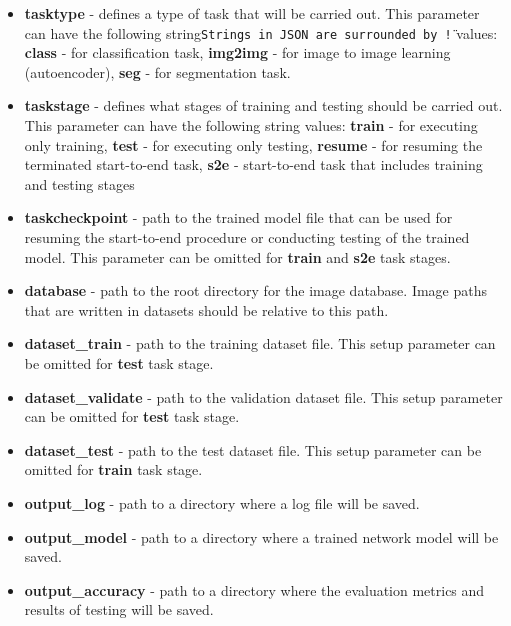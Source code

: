 \documentclass[a4paper, 11pt]{article}
\begin{document}
\begin{itemize}
    \item \textbf{tasktype} - defines a type of task that will be carried out. This parameter can have the following string\texttt{Strings in JSON are surrounded by \"!} values: \textbf{class} - for classification task, 
    \textbf{img2img} - for image to image learning (autoencoder), \textbf{seg} - for segmentation task.
    
    \item \textbf{taskstage} - defines what stages of training and testing should be carried out. This parameter can have the following string values: \textbf{train} - for executing only training, \textbf{test} - for executing only testing, \textbf{resume} - for resuming the terminated start-to-end task, \textbf{s2e} - start-to-end task that includes training and testing stages
    
    \item \textbf{taskcheckpoint} - path to the trained model file that can be used for resuming the start-to-end procedure or conducting testing of the trained model. This parameter can be omitted for \textbf{train} and \textbf{s2e} task stages.
    
    \item \textbf{database} - path to the root directory for the image database. Image paths that are written in datasets should be relative to this path.
    
    \item \textbf{dataset\_train} - path to the training dataset file. This setup parameter can be omitted for \textbf{test} task stage.
    
    \item \textbf{dataset\_validate} - path to the validation dataset file. This setup parameter can be omitted for \textbf{test} task stage.
    
    \item \textbf{dataset\_test} - path to the test dataset file. This setup parameter can be omitted for \textbf{train} task stage.
    
    \item \textbf{output\_log} - path to a directory where a log file will be saved.
    
    \item \textbf{output\_model} - path to a directory where a trained network model will be saved.
    
    \item \textbf{output\_accuracy} - path to a directory where the evaluation metrics and results of testing will be saved.
    

\end{itemize}
\end{document}
